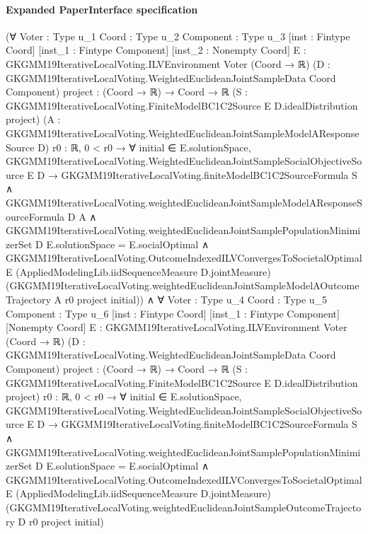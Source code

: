 \documentclass[10pt]{article}
\begin{document}
\paragraph{Expanded PaperInterface specification}
\begin{ReviewVerbatim}
(∀ {Voter : Type u_1} {Coord : Type u_2} {Component : Type u_3} [inst : Fintype Coord] [inst_1 : Fintype Component]
    [inst_2 : Nonempty Coord] {E : GKGMM19IterativeLocalVoting.ILVEnvironment Voter (Coord → ℝ)}
    (D : GKGMM19IterativeLocalVoting.WeightedEuclideanJointSampleData Coord Component)
    {project : (Coord → ℝ) → Coord → ℝ}
    (S : GKGMM19IterativeLocalVoting.FiniteModelBC1C2Source E D.idealDistribution project)
    (A : GKGMM19IterativeLocalVoting.WeightedEuclideanJointSampleModelAResponseSource D) {r0 : ℝ},
    0 < r0 →
      ∀ initial ∈ E.solutionSpace,
        GKGMM19IterativeLocalVoting.WeightedEuclideanJointSampleSocialObjectiveSource E D →
          GKGMM19IterativeLocalVoting.finiteModelBC1C2SourceFormula S ∧
            GKGMM19IterativeLocalVoting.weightedEuclideanJointSampleModelAResponseSourceFormula D A ∧
              GKGMM19IterativeLocalVoting.weightedEuclideanJointSamplePopulationMinimizerSet D E.solutionSpace =
                  E.socialOptimal ∧
                GKGMM19IterativeLocalVoting.OutcomeIndexedILVConvergesToSocietalOptimal E
                  (AppliedModelingLib.iidSequenceMeasure D.jointMeasure)
                  (GKGMM19IterativeLocalVoting.weightedEuclideanJointSampleModelAOutcomeTrajectory A r0 project
                    initial)) ∧
  ∀ {Voter : Type u_4} {Coord : Type u_5} {Component : Type u_6} [inst : Fintype Coord] [inst_1 : Fintype Component]
    [Nonempty Coord] {E : GKGMM19IterativeLocalVoting.ILVEnvironment Voter (Coord → ℝ)}
    (D : GKGMM19IterativeLocalVoting.WeightedEuclideanJointSampleData Coord Component)
    {project : (Coord → ℝ) → Coord → ℝ}
    (S : GKGMM19IterativeLocalVoting.FiniteModelBC1C2Source E D.idealDistribution project) {r0 : ℝ},
    0 < r0 →
      ∀ initial ∈ E.solutionSpace,
        GKGMM19IterativeLocalVoting.WeightedEuclideanJointSampleSocialObjectiveSource E D →
          GKGMM19IterativeLocalVoting.finiteModelBC1C2SourceFormula S ∧
            GKGMM19IterativeLocalVoting.weightedEuclideanJointSamplePopulationMinimizerSet D E.solutionSpace =
                E.socialOptimal ∧
              GKGMM19IterativeLocalVoting.OutcomeIndexedILVConvergesToSocietalOptimal E
                (AppliedModelingLib.iidSequenceMeasure D.jointMeasure)
                (GKGMM19IterativeLocalVoting.weightedEuclideanJointSampleOutcomeTrajectory D r0 project initial)
\end{ReviewVerbatim}
\end{document}
